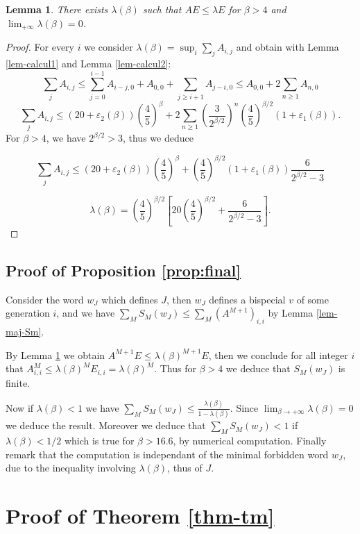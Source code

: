 \documentclass[11 pt]{article}
\newtheorem{lemma}[proposition]{Lemma}
\theoremstyle{definition}
\begin{document}
\begin{lemma}\label{lem_inegalite}
There exists $\lambda(\beta)$ such that $AE\leq \lambda E$ for $\beta>4$ and $\lim_{+\infty} \lambda(\beta)=0$.
\end{lemma}
\begin{proof}For every $i$ we consider $\lambda(\beta)= \sup_i \sum_{j}A_{i,j}$ and obtain with Lemma \ref{lem-calcul1} and Lemma \ref{lem-calcul2}:
$$\sum_j A_{i,j}\leq \sum_{j=0}^{i-1} A_{i-j,0}+A_{0,0}+\sum_{j\geq i+1} A_{j-i,0}\leq A_{0,0}+2\sum_{n\geq 1} A_{n,0}$$
$$\sum_{j} A_{i,j}\leq (20+\varepsilon_2(\beta))(\frac{4}{5})^\beta+2\sum_{n\geq 1}(\frac{3}{2^{\beta/2}})^{n}(\frac{4}{5})^{\beta/2}(1+\varepsilon_1(\beta)).$$
For $\beta>4$, we have $2^{\beta/2}>3$, thus we deduce

$$\sum_{j} A_{i,j}\leq (20+\varepsilon_2(\beta))(\frac{4}{5})^\beta+(\frac{4}{5})^{\beta/2}(1+\varepsilon_1(\beta))\frac{6}{2^{\beta/2}-3}$$

$$\lambda(\beta)=(\frac{4}{5})^{\beta/2}[20(\frac{4}{5})^{\beta/2}+\frac{6}{2^{\beta/2}-3}].$$




\end{proof}

\subsection{Proof of Proposition \ref{prop:final}}
Consider the word $w_J$ which defines $J$, then $w_J$ defines a bispecial $v$ of some generation $i$, and we have $\sum_M S_M(w_J)\leq \sum_M (A^{M+1})_{i,i}$ by Lemma \ref{lem-maj-Sm}. 

By Lemma \ref{lem_inegalite} we obtain $A^{M+1}E\leq \lambda(\beta)^{M+1}E$, then we conclude for all integer $i$ that $A^M_{i,i}\leq \lambda(\beta)^M E_{i,i}=\lambda(\beta)^M$. Thus for $\beta>4$ we deduce that $S_M(w_J)$ is finite.

Now if $\lambda(\beta)<1$ we have $\sum_M S_M(w_J)\leq \frac{\lambda(\beta)}{1-\lambda(\beta)}$. Since $\lim_{\beta\rightarrow+\infty} \lambda(\beta)=0$ we deduce the result. Moreover we deduce that $\sum_M S_M(w_J)<1$ if $\lambda(\beta)<1/2$ which is true for $\beta>16.6$, by numerical computation. Finally remark that the computation is independant of the minimal forbidden word $w_J$, due to the inequality involving $\lambda(\beta)$, thus of $J$. 




\section{Proof of Theorem \ref{thm-tm}}
\end{document}
